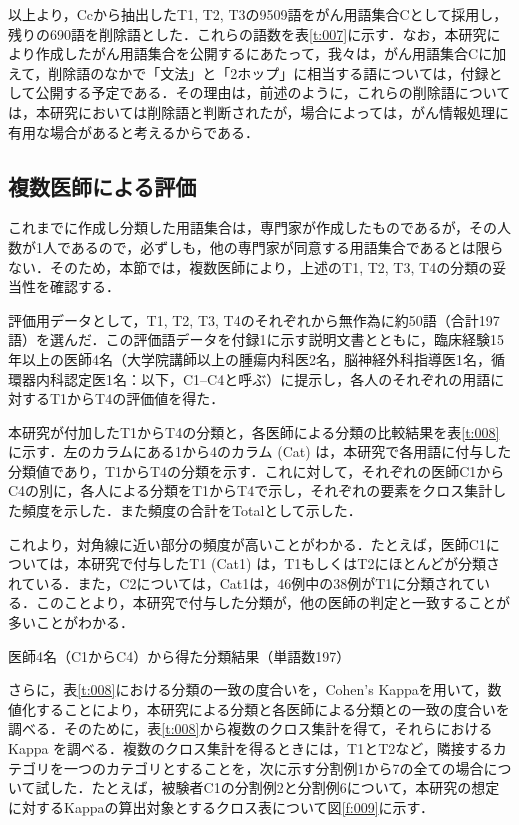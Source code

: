 \documentclass[japanese]{jnlp_1.4}
\begin{document}
以上より，Ccから抽出したT1, T2, T3の9509語をがん用語集合Cとして採用し，残りの690語を削除語とした．これらの語数を表\ref{t:007}に示す．なお，本研究により作成したがん用語集合を公開するにあたって，我々は，がん用語集合Cに加えて，削除語のなかで「文法」と「2ホップ」に相当する語については，付録として公開する予定である．その理由は，前述のように，これらの削除語については，本研究においては削除語と判断されたが，場合によっては，がん情報処理に有用な場合があると考えるからである．


\subsection{複数医師による評価}
\label{s:複数医師による評価}

これまでに作成し分類した用語集合は，専門家が作成したものであるが，その人数が1人であるので，必ずしも，他の専門家が同意する用語集合であるとは限らない．そのため，本節では，複数医師により，上述のT1, T2, T3, T4の分類の妥当性を確認する．

評価用データとして，T1, T2, T3, T4のそれぞれから無作為に約50語（合計197語）を選んだ．この評価語データを付録1に示す説明文書とともに，臨床経験15年以上の医師4名（大学院講師以上の腫瘍内科医2名，脳神経外科指導医1名，循環器内科認定医1名：以下，C1--C4と呼ぶ）に提示し，各人のそれぞれの用語に対するT1からT4の評価値を得た．

本研究が付加したT1からT4の分類と，各医師による分類の比較結果を表\ref{t:008}に示す．左のカラムにある1から4のカラム (Cat) は，本研究で各用語に付与した分類値であり，T1からT4の分類を示す．これに対して，それぞれの医師C1からC4の別に，各人による分類をT1からT4で示し，それぞれの要素をクロス集計した頻度を示した．また頻度の合計をTotalとして示した．

これより，対角線に近い部分の頻度が高いことがわかる．たとえば，医師C1については，本研究で付与したT1 (Cat1) は，T1もしくはT2にほとんどが分類されている．また，C2については，Cat1は，46例中の38例がT1に分類されている．このことより，本研究で付与した分類が，他の医師の判定と一致することが多いことがわかる．
 
\begin{table}[b]
 \caption{医師4名（C1からC4）から得た分類結果（単語数197）}
 \begin{center}

 \end{center}
 \label{t:008}
\end{table}

さらに，表\ref{t:008}における分類の一致の度合いを，Cohen's Kappa\cite{c18}を用いて，数値化することにより，本研究による分類と各医師による分類との一致の度合いを調べる．そのために，表\ref{t:008}から複数のクロス集計を得て，それらにおける Kappa を調べる．複数のクロス集計を得るときには，T1とT2など，隣接するカテゴリを一つのカテゴリとすることを，次に示す分割例1から7の全ての場合について試した．たとえば，被験者C1の分割例2と分割例6について，本研究の想定に対するKappaの算出対象とするクロス表について図\ref{f:009}に示す．
\end{document}
